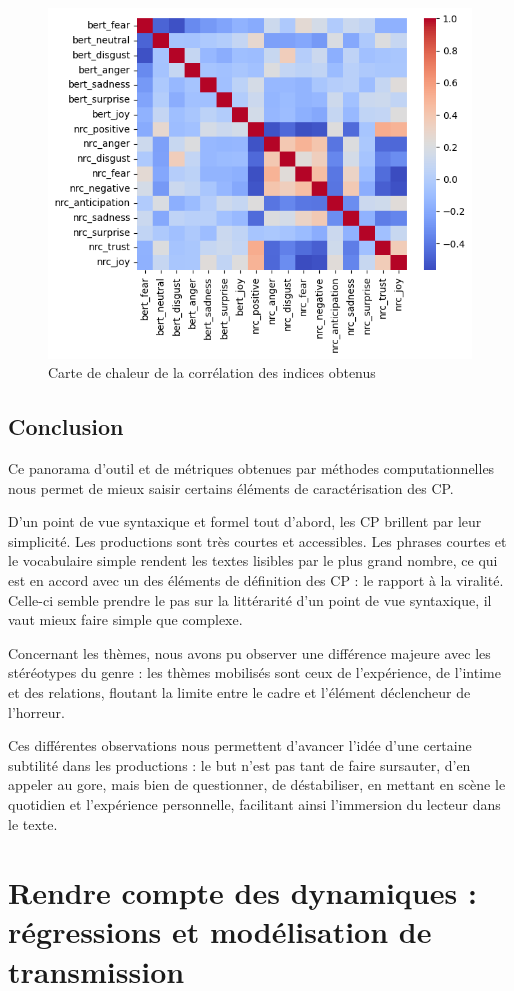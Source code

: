 \documentclass[12pt,a4paper,oneside,titlepage]{book} %
\begin{document}
\begin{figure}
    \centering
    \includegraphics[width=0.5\linewidth]{illustration/nrc_bert_corr.png}
    \caption{Carte de chaleur de la corrélation des indices obtenus}
    \label{fig:corr_emotions}
\end{figure}


\section{Conclusion}

Ce panorama d'outil et de métriques obtenues par méthodes computationnelles nous permet de mieux saisir certains éléments de caractérisation des CP. 
\par
D'un point de vue syntaxique et formel tout d'abord,  les CP brillent par leur simplicité. Les productions sont très courtes et accessibles. Les phrases courtes et le vocabulaire simple rendent les textes lisibles par le plus grand nombre, ce qui est en accord avec un des éléments de définition des CP : le rapport à la viralité. Celle-ci semble prendre le pas sur la littérarité d'un point de vue syntaxique, il vaut mieux faire simple que complexe.

\par Concernant les thèmes, nous avons pu observer une différence majeure avec les stéréotypes du genre : les thèmes mobilisés sont ceux de l'expérience, de l'intime et des relations, floutant la limite entre le cadre et l'élément déclencheur de l'horreur.

\par Ces différentes observations nous permettent d'avancer l'idée d'une certaine subtilité dans les productions : le but n'est pas tant de faire sursauter, d'en appeler au gore, mais bien de questionner, de déstabiliser, en mettant en scène le quotidien et l'expérience personnelle, facilitant ainsi l'immersion du lecteur dans le texte.



\chapter[La recette du succès]{Rendre compte des dynamiques : régressions et modélisation de transmission}
\end{document}
